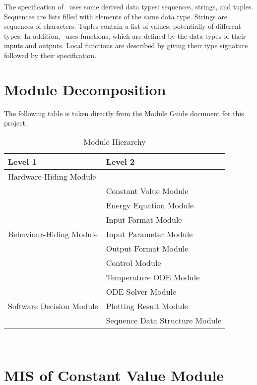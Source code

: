\documentclass[12pt, titlepage]{article}
\begin{document}
\noindent
The specification of \progname \ uses some derived data types: sequences, strings, and
tuples. Sequences are lists filled with elements of the same data type. Strings
are sequences of characters. Tuples contain a list of values, potentially of
different types. In addition, \progname \ uses functions, which
are defined by the data types of their inputs and outputs. Local functions are
described by giving their type signature followed by their specification.

\section{Module Decomposition}

The following table is taken directly from the Module Guide document for this project.

\begin{table}[h!]
\centering
\begin{tabular}{p{} p{}}
\toprule
\textbf{Level 1} & \textbf{Level 2}\\
\midrule
{Hardware-Hiding Module} & ~ \\
\midrule

\multirow{7}{0.3\textwidth}{Behaviour-Hiding Module} 
& Constant Value Module\\ 
& Energy Equation Module\\
& Input Format Module\\
& Input Parameter Module\\
& Output Format Module\\
& Control Module\\
& Temperature ODE Module\\
\midrule

\multirow{3}{0.3\textwidth}{Software Decision Module} 
& ODE Solver Module\\
& Plotting Result Module\\
& Sequence Data Structure Module\\
\bottomrule

\end{tabular}
\caption{Module Hierarchy}
\label{TblMH}
\end{table}


\newpage
~\newpage

\section{MIS of Constant Value Module} \label{Constant_Module} 
\end{document}
